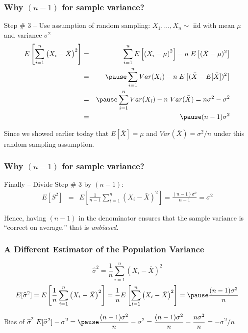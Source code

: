 \documentclass[handout]{beamer}
\begin{document}
\begin{frame}
\frametitle{Why $(n-1)$ for sample variance?}
\begin{block}{Step \# 3 -- Use assumption of random sampling:}
\alert{$X_1, \hdots, X_n \sim \mbox{ iid}$ with mean $\mu$ and variance $\sigma^2$}
	\begin{eqnarray*}
		E\left[\sum_{i=1}^n \left(X_i - \bar{X}\right)^2\right] &=&  \sum_{i=1}^n E\left[\left(X_i - \mu\right)^2\right] -n\;E\left[ (\bar{X}-\mu)^2\right]\\
		&=&  \pause \sum_{i=1}^n Var(X_i) -n\;E\left[ (\bar{X}-E[\bar{X}])^2\right]\\
		&=& \pause   \sum_{i=1}^n Var(X_i) -n\;Var(\bar{X})= n\sigma^2 - \sigma^2\\
		&=& \pause (n-1)\sigma^2
	\end{eqnarray*}
\end{block}
\alert{Since we showed earlier today that  $E[\bar{X}]=\mu$ and $Var(\bar{X})=\sigma^2/n$ under this random sampling assumption.}
\end{frame}

\begin{frame}
\frametitle{Why $(n-1)$ for sample variance?}
\begin{block}{Finally -- Divide Step \# 3 by $(n-1)$:}
	\begin{eqnarray*}
		E[S^2] &=& E\left[\frac{1}{n-1}\sum_{i=1}^n \left(X_i - \bar{X}\right)^2\right]= \frac{(n-1)\sigma^2}{n-1} = \sigma^2
	\end{eqnarray*}
\end{block}
\alert{Hence, having $(n-1)$ in the denominator ensures that the sample variance is ``correct on average,'' that is \emph{unbiased}.}
\end{frame}
\begin{frame}
\frametitle{A Different Estimator of the Population Variance}

$$\widehat{\sigma}^2 = \frac{1}{n}\sum_{i=1}^n \left(X_i - \bar{X}\right)^2$$
\pause
\begin{eqnarray*}
E[\widehat{\sigma}^2 ] = E\left[\frac{1}{n}\sum_{i=1}^n \left(X_i - \bar{X}\right)^2  \right]= \frac{1}{n} E\left[\sum_{i=1}^n \left(X_i - \bar{X}\right)^2\right] = \pause \frac{(n-1)\sigma^2}{n} 
\end{eqnarray*}

\begin{block}{Bias of $\widehat{\sigma}^2$}
\vspace{0.75em}
$\displaystyle E[\widehat{\sigma}^2 ] - \sigma^2 = \pause \frac{(n-1)\sigma^2}{n}  - \sigma^2 = \frac{(n-1)\sigma^2}{n}  - \frac{n\sigma^2}{n} = -\sigma^2/n$
\end{block}
\end{frame}
\end{document}
